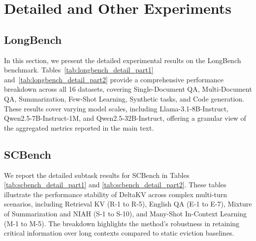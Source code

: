 \section{Detailed and Other Experiments}

\subsection{LongBench}

In this section, we present the detailed experimental results on the LongBench benchmark. Tables~\ref{tab:longbench_detail_part1} and~\ref{tab:longbench_detail_part2} provide a comprehensive performance breakdown across all 16 datasets, covering Single-Document QA, Multi-Document QA, Summarization, Few-Shot Learning, Synthetic tasks, and Code generation. These results cover varying model scales, including Llama-3.1-8B-Instruct, Qwen2.5-7B-Instruct-1M, and Qwen2.5-32B-Instruct, offering a granular view of the aggregated metrics reported in the main text.




\subsection{SCBench}

We report the detailed subtask results for SCBench in Tables \ref{tab:scbench_detail_part1} and \ref{tab:scbench_detail_part2}. These tables illustrate the performance stability of DeltaKV across complex multi-turn scenarios, including Retrieval KV (R-1 to R-5), English QA (E-1 to E-7), Mixture of Summarization and NIAH (S-1 to S-10), and Many-Shot In-Context Learning (M-1 to M-5). The breakdown highlights the method's robustness in retaining critical information over long contexts compared to static eviction baselines.



